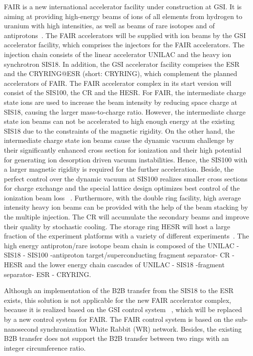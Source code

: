 FAIR is a new international accelerator facility under construction at GSI. It is aiming at providing high-energy beams of ions of all elements from hydrogen to uranium with high intensities, as well as beams of rare isotopes and of antiprotons~\cite{eschke_international_2005, noauthor_fair_2011}.  The FAIR accelerators will be supplied with ion beams by the GSI accelerator facility, which comprises the injectors for the FAIR accelerators. The injection chain consists of the linear accelerator UNILAC and the heavy ion synchrotron SIS18. In addition, the GSI accelerator facility comprises the ESR and the CRYRING@ESR (short: CRYRING), which complement the planned accelerators of FAIR. The FAIR accelerator complex in its start version will consist of the SIS100, the CR and the HESR. For FAIR, the intermediate charge state ions are used to increase the beam intensity by reducing space charge at SIS18, causing the larger mass-to-charge ratio. However, the intermediate charge state ion beams can not be accelerated to high enough energy at the existing SIS18 due to the constraints of the magnetic rigidity. On the other hand, the intermediate charge state ion beams cause the dynamic vacuum challenge by their significantly enhanced cross section for ionization and their high potential for generating ion desorption driven vacuum instabilities. Hence, the SIS100 with a larger magnetic rigidity is required for the further acceleration. Beside, the perfect control over the dynamic vacuum at SIS100 realizes smaller cross sections for charge exchange and the special lattice design optimizes best control of the ionization beam loss ~\cite{nolden_collector_2006, bar_technical_2013}. Furthermore, with the double ring facility, high average intensity heavy ion beams can be provided with the help of the beam stacking by the multiple injection. The CR will accumulate the secondary beams and improve their quality by stochastic cooling. The storage ring HESR will host a large fraction of the experiment platforms with a variety of different experiments~\cite{spiller_fair_2006, steck_advanced_2009}. The high energy antiproton/rare isotope beam chain is composed of the UNILAC - SIS18 - SIS100 -antiproton target/superconducting fragment separator- CR - HESR and the lower energy chain cascades of UNILAC - SIS18 -fragment separator- ESR - CRYRING.

Although an implementation of the B2B transfer from the SIS18 to the ESR exists, this solution is not applicable for the new FAIR accelerator complex, because it is realized based on the GSI control system ~\cite{krause_gsi_1991}, which will be replaced by a new control system for FAIR. The FAIR control system is based on the sub-nanosecond synchronization White Rabbit (WR) network. Besides, the existing B2B transfer does not support the B2B transfer between two rings with an integer circumference ratio. 

